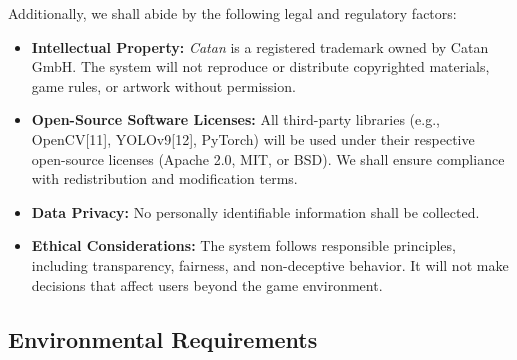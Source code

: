 \documentclass{article}
\begin{document}
Additionally, we shall abide by the following legal and regulatory factors:
\begin{itemize}
    \item \textbf{Intellectual Property:}
    \emph{Catan} is a registered trademark owned by Catan GmbH. The system will not reproduce or distribute copyrighted materials, game rules, or artwork without permission.

    \item \textbf{Open-Source Software Licenses:}
    All third-party libraries (e.g., OpenCV[11], YOLOv9[12], PyTorch) will be used under their respective open-source licenses (Apache 2.0, MIT, or BSD). We shall ensure compliance with redistribution and modification terms.

    \item \textbf{Data Privacy:}
    No personally identifiable information shall be collected.

    \item \textbf{Ethical \AI{} Considerations:}
    The system follows responsible \AI{} principles, including transparency, fairness, and non-deceptive behavior. It will not make decisions that affect users beyond the game environment.
\end{itemize}

\subsection*{Environmental Requirements}
\end{document}
